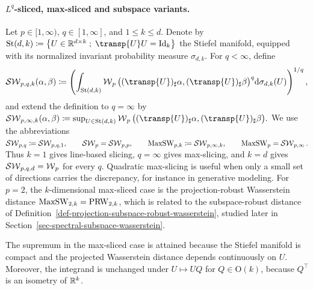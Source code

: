 \paragraph{\texorpdfstring{$L^q$-sliced, max-sliced and subspace variants.}{L^q-sliced, max-sliced and subspace variants.}}
\begin{defn}\label{def-sliced-variants}
Let $p\in[1,\infty)$, $q\in[1,\infty]$, and $1\leq k\leq d$. Denote by \(\mathrm{St}(d,k) \eqdef \enscond{U\in\RR^{d\times k}}{\transp{U}U=\Id_k}\)
the Stiefel manifold, equipped with its normalized invariant probability
measure $\sigma_{d,k}$. For $q<\infty$, define
\begin{equation}\label{eq-lq-subspace-sliced}
\SW_{p,q,k}(\alpha,\beta)
\eqdef
\left(
\int_{\mathrm{St}(d,k)}
\Wass_p\big((\transp{U})_\sharp\alpha,
(\transp{U})_\sharp\beta\big)^q
\d\sigma_{d,k}(U)
\right)^{1/q},
\end{equation}
and extend the definition to $q=\infty$ by \(\SW_{p,\infty,k}(\alpha,\beta) \eqdef \sup_{U\in\mathrm{St}(d,k)} \Wass_p\big((\transp{U})_\sharp\alpha, (\transp{U})_\sharp\beta\big).\)
We use the abbreviations
\(\operatorname{\mathcal{SW}}_{p,q}\coloneqq\operatorname{\mathcal{SW}}_{p,q,1}, \qquad \operatorname{\mathcal{SW}}_p=\operatorname{\mathcal{SW}}_{p,p}, \qquad \operatorname{MaxSW}_{p,k}\coloneqq\operatorname{\mathcal{SW}}_{p,\infty,k}, \qquad \operatorname{MaxSW}_p=\operatorname{\mathcal{SW}}_{p,\infty}.\)
Thus $k=1$ gives line-based slicing, $q=\infty$ gives max-slicing,
and $k=d$ gives $\operatorname{\mathcal{SW}}_{p,q,d}=\operatorname{\mathcal{W}}_p$ for every $q$. Quadratic max-slicing is useful
when only a small set of directions carries the discrepancy, for instance in
generative modeling. For $p=2$, the $k$-dimensional
max-sliced case is the projection-robust Wasserstein distance
$\operatorname{MaxSW}_{2,k}=\operatorname{PRW}_{2,k}$, which is related to the
subspace-robust distance of
Definition~\ref{def-projection-subspace-robust-wasserstein}, studied later in
Section~\ref{sec-spectral-subspace-wasserstein}.
\end{defn}
The supremum in the max-sliced case is attained because the Stiefel manifold is compact and the projected Wasserstein distance depends continuously on $U$. Moreover, the integrand is unchanged under $U\mapsto UQ$ for $Q\in\mathrm O(k)$, because $Q^\top$ is an isometry of $\mathbb{R}^k$.


